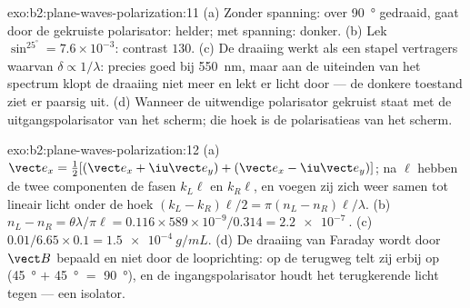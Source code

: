 \begin{solution}{exo:b2:plane-waves-polarization:11}
(a) Zonder spanning: over \qty{90}{\degree} gedraaid, gaat door de gekruiste
polarisator: helder; met spanning: donker. (b) Lek
$\sin^25^\circ = 7.6 \times 10^{-3}$: contrast $130$. (c) De draaiing werkt
als een stapel vertragers waarvan $\delta \propto 1/\lambda$: precies goed
bij \qty{550}{nm}, maar aan de uiteinden van het spectrum klopt de draaiing
niet meer en lekt er licht door --- de donkere toestand ziet er paarsig uit.
(d) Wanneer de uitwendige polarisator gekruist staat met de
uitgangspolarisator van het scherm; die hoek is de polarisatieas van het
scherm.
\end{solution}

\begin{solution}{exo:b2:plane-waves-polarization:12}
(a)
$\vect e_x = \tfrac12[(\vect e_x + \iu\vect e_y) + (\vect e_x - \iu\vect e_y)]$;
na $\ell$ hebben de twee componenten de fasen $k_L\ell$ en $k_R\ell$, en
voegen zij zich weer samen tot lineair licht onder de hoek
$(k_L - k_R)\ell/2 = \pi(n_L - n_R)\ell/\lambda$. (b)
$n_L -
n_R = \theta\lambda/\pi\ell = 0.116 \times 589 \times 10^{-9}/0.314 = \qty{2.2e-7}{}$.
(c) $0.01/6.65 \times 0.1 = \qty{1.5e-4}{g/mL}$. (d) De draaiing van Faraday
wordt door $\vect B$ bepaald en niet door de looprichting: op de terugweg
telt zij erbij op (\qty{45}{\degree} $+$ \qty{45}{\degree} $=$
\qty{90}{\degree}), en de ingangspolarisator houdt het terugkerende licht
tegen --- een isolator.
\end{solution}

